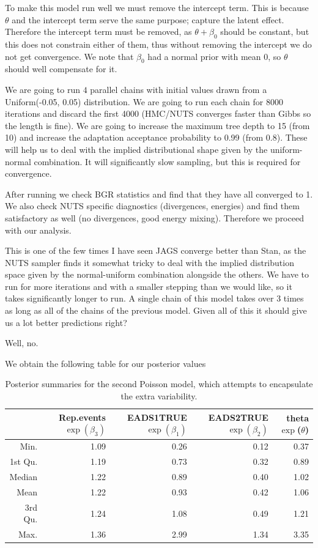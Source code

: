 \documentclass[10pt]{extarticle}
\begin{document}
To make this model run well we must remove the intercept term. This is because $\theta$ and the intercept term serve the same purpose; capture the latent effect. Therefore the intercept term must be removed, as $\theta + \beta_0$ should be constant, but this does not constrain either of them, thus without removing the intercept we do not get convergence. We note that $\beta_0$ had a normal prior with mean 0, so $\theta$ should well compensate for it.

We are going to run $4$ parallel chains with initial values drawn from a Uniform(-0.05, 0.05) distribution. We are going to run each chain for 8000 iterations and discard the first 4000 (HMC/NUTS converges faster than Gibbs so the length is fine). We are going to increase the maximum tree depth to 15 (from 10) and increase the adaptation acceptance probability to 0.99 (from 0.8). These will help us to deal with the implied distributional shape given by the uniform-normal combination. It will significantly slow sampling, but this is required for convergence.

After running we check BGR statistics and find that they have all converged to 1. We also check NUTS specific diagnostics (divergences, energies) and find them satisfactory as well (no divergences, good energy mixing). Therefore we proceed with our analysis.

This is one of the few times I have seen JAGS converge better than Stan, as the NUTS sampler finds it somewhat tricky to deal with the implied distribution space given by the normal-uniform combination alongside the others. We have to run for more iterations and with a smaller stepping than we would like, so it takes significantly longer to run. A single chain of this model takes over 3 times as long as all of the chains of the previous model. Given all of this it should give us a lot better predictions right?

Well, no.

We obtain the following table for our posterior values

\begin{table}[ht]
	\centering
	\begin{tabular}{r|rrrr}
		\hline
		& Rep.events $\exp(\beta_3)$ & EADS1TRUE $\exp(\beta_1)$ & EADS2TRUE $\exp(\beta_2)$ & theta $\exp$($\theta$) \\ 
		\hline
		Min. & 1.09 & 0.26 & 0.12 & 0.37 \\ 
		1st Qu. & 1.19 & 0.73 & 0.32 & 0.89 \\ 
		Median & 1.22 & 0.89 & 0.40 & 1.02 \\ 
		Mean & 1.22 & 0.93 & 0.42 & 1.06 \\ 
		3rd Qu. & 1.24 & 1.08 & 0.49 & 1.21 \\ 
		Max. & 1.36 & 2.99 & 1.34 & 3.35 \\ 
		\hline
	\end{tabular}
\caption{Posterior summaries for the second Poisson model, which attempts to encapsulate the extra variability.}
\label{tab:postsum_poexv}
\end{table}
\end{document}
